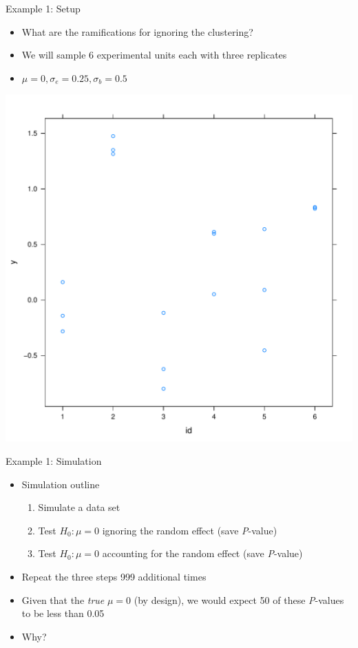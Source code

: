 \documentclass[xcolor=x11names,compress]{beamer}\usepackage[]{graphicx}\usepackage[]{color}
\newenvironment{knitrout}{}{} %
\begin{document}
\begin{frame}[fragile]{Example 1: Setup}
  \begin{itemize}
  \item What are the ramifications for ignoring the clustering?
  \item We will sample 6 experimental units each with three replicates
  \item $\mu=0, \sigma_e=0.25,\sigma_b=0.5$
  \end{itemize}
  
\begin{knitrout}\tiny
{}\color{fgcolor}

{\centering \includegraphics[width=.6\linewidth]{figure/beamer-unnamed-chunk-30-1} 

}



\end{knitrout}
\end{frame}


\begin{frame}[fragile]{Example 1: Simulation}

  
   \begin{itemize}
  \item Simulation outline
  \begin{enumerate}
  \item Simulate a data set
  \item Test $H_0: \mu=0$ ignoring the random effect (save {\it P}-value) 
  \item Test $H_0: \mu=0$ accounting for the random effect (save {\it P}-value) 
  \end{enumerate}
  \item Repeat the three steps 999 additional times
  \item Given that the {\it true} $\mu=0$ (by design), we would expect
        50 of these  {\it P}-values to be less than 0.05
  \item Why?
    \end{itemize}
\end{frame}
\end{document}
